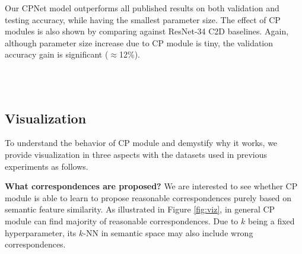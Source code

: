 \documentclass[10pt,twocolumn,letterpaper]{article}
\begin{document}
Our CPNet model outperforms all published results on both validation and testing accuracy, while having the smallest parameter size. The effect of CP modules is also shown by comparing against ResNet-34 C2D baselines. Again, although parameter size increase due to CP module is tiny, the validation accuracy gain is significant ($\approx$12\%).



\begin{figure*}[h]
\captionsetup{position=bottom}
\centering
{} \vspace{-2ex} \\
 \vspace{-2ex} \\
\caption{Visualization on our final models. The starting points of arrows are located at feature $i_0$. Arrows point to the $k$ proposed correspondences ($k=8$) of feature $i_0$. Proposed correspondences whose indices are in $\mathcal{A}^{i_0}$ (defined in Equation \eqref{eq:activate:neighbor}) are pointed by \textcolor{red}{red arrows} otherwise by \textcolor{blue}{blue arrows}. Feature changes after going through CP module are shown in heatmaps.} 
\label{fig:viz}
\end{figure*}



\subsection{Visualization}


To understand the behavior of CP module and demystify why it works,
we provide visualization in three aspects with the datasets used in previous experiments as follows.

\textbf{What correspondences are proposed?} We are interested to see whether CP module is able to learn to propose reasonable correspondences purely based on semantic feature similarity. As illustrated in Figure \ref{fig:viz}, in general CP module can find majority of reasonable correspondences. Due to $k$ being a fixed hyperparameter, its $k$-NN in semantic space may also include wrong correspondences.
\end{document}
